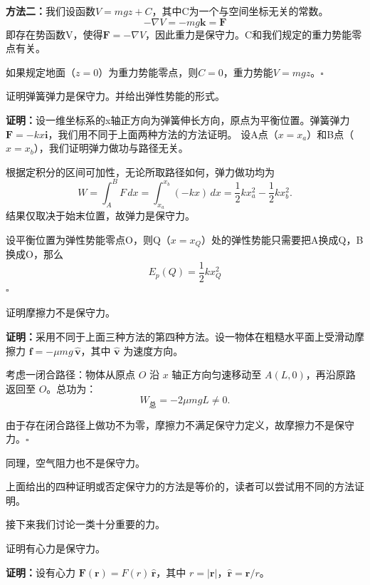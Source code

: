 \textbf{方法二：}我们设函数$V = mgz +C$，其中C为一个与空间坐标无关的常数。
\[
    -\nabla V = -mg \mathbf{k} = \mathbf{F}
\]
即存在势函数V，使得$  \mathbf{F} = -\nabla V $，因此重力是保守力。C和我们规定的重力势能零点有关。

如果规定地面（$z=0$）为重力势能零点，则$C = 0$，重力势能$V = mgz$。\hfill$\square$
\begin{tcolorbox}[colback=white!5!white,colframe=green!50!black,title=弹簧弹力]
    证明弹簧弹力是保守力。并给出弹性势能的形式。
\end{tcolorbox}
\noindent \textbf{证明：}设一维坐标系的x轴正方向为弹簧伸长方向，原点为平衡位置。弹簧弹力$\mathbf{F} = -kx \mathbf{i}$，我们用不同于上面两种方法的方法证明。
设A点（$x = x_a$）和B点（$x = x_b$），我们证明弹力做功与路径无关。

根据定积分的区间可加性，无论所取路径如何，弹力做功均为
\[
    W = \int_{A}^{B} F\,dx = \int_{x_a}^{x_b} (-kx)\,dx = \frac{1}{2}k x_a^2 - \frac{1}{2}k x_b^2.
\]
结果仅取决于始末位置，故弹力是保守力。

设平衡位置为弹性势能零点O，则Q（$x = x_Q$）处的弹性势能只需要把A换成Q，B换成O，那么
\[
    E_p(Q ) =  \frac{1}{2}k x_Q^2
\]
\hfill$\square$

\begin{tcolorbox}[colback=white!5!white, colframe=green!50!black, title=摩擦力]
    证明摩擦力不是保守力。
\end{tcolorbox}
\noindent \textbf{证明：}采用不同于上面三种方法的第四种方法。设一物体在粗糙水平面上受滑动摩擦力 \( \mathbf{f} = -\mu mg \,\hat{\mathbf{v}} \)，其中 \(\hat{\mathbf{v}}\) 为速度方向。

考虑一闭合路径：物体从原点 \(O\) 沿 \(x\) 轴正方向匀速移动至 \(A(L,0)\)，再沿原路返回至 \(O\)。总功为：
\[
    W_{\text{总}} = -2\mu mg L \neq 0.
\]

由于存在闭合路径上做功不为零，摩擦力不满足保守力定义，故摩擦力不是保守力。\hfill$\square$

同理，空气阻力也不是保守力。

上面给出的四种证明或否定保守力的方法是等价的，读者可以尝试用不同的方法证明。

接下来我们讨论一类十分重要的力。
\begin{tcolorbox}[colback=white!5!white, colframe=green!50!black, title=有心力]
    证明有心力是保守力。
\end{tcolorbox}
\noindent \textbf{证明：}设有心力 \(\mathbf{F}(\mathbf{r}) = F(r)\,\hat{\mathbf{r}}\)，其中 \(r = |\mathbf{r}|\)，\(\hat{\mathbf{r}} = \mathbf{r}/r\)。

